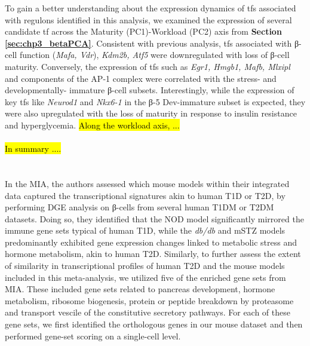






To gain a better understanding about the expression dynamics of \glspl{tf} associated with regulons identified in this analysis, we examined the expression of several candidate \gls{tf} across the Maturity (PC1)-Workload (PC2) axis from \textbf{Section \ref{sec:chp3_betaPCA}}. Consistent with previous analysis, \glspl{tf} associated with β-cell function (\textit{Mafa, Vdr}), \textit{Kdm2b, Atf5} were downregulated with loss of β-cell maturity. Conversely, the expression of \glspl{tf} such as \textit{Egr1, Hmgb1, Mafb, Mlxipl} and components of the AP-1 complex were correlated with the stress- and  developmentally- immature β-cell subsets. Interestingly, while the expression of key \glspl{tf} like \textit{Neurod1} and \textit{Nkx6-1} in the β-5 Dev-immature subset is expected, they were also upregulated with the loss of maturity in response to insulin resistance and hyperglycemia. \hl{Along the workload axis, ...}\\\\
\hl{In summary ....}

\clearpage

\section{}
\label{sec:chp3_T2Dgenes}

In the MIA, the authors assessed which mouse models within their integrated data captured the transcriptional signatures akin to human T1D or T2D, by performing DGE analysis on β-cells from several human T1DM or T2DM datasets. Doing so, they identified that the NOD model significantly mirrored the immune gene sets typical of human T1D, while the \textit{db/db} and mSTZ models predominantly exhibited gene expression changes linked to metabolic stress and hormone metabolism, akin to human T2D. Similarly, to further assess the extent of similarity in transcriptional profiles of human T2D and the mouse models included in this meta-analysis, we utilized five of the enriched gene sets from MIA. These included gene sets related to pancreas development, hormone metabolism, ribosome biogenesis, protein or peptide breakdown by proteasome and transport vescile of the constitutive secretory pathways. For each of these gene sets, we first identified the orthologous genes in our mouse dataset and then performed gene-set scoring on a single-cell level.\\

